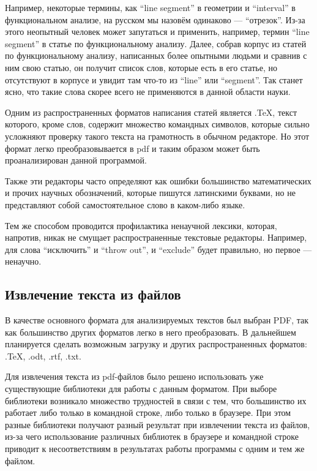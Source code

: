 \documentclass[a4paper,openbib]{report}
\begin{document}
Например, некоторые термины, как ``line segment'' в геометрии и ``interval'' в функциональном анализе, на русском мы назовём одинаково --- ``отрезок''. 
Из-за этого неопытный человек может запутаться и применить, например, термин ``line segment'' в статье по функциональному анализу. Далее, собрав корпус 
из статей по функциональному анализу, написанных более опытными людьми и сравнив с ним свою статью, он получит список слов, которые есть в его статье, но 
отсутствуют в корпусе и увидит там что-то из ``line'' или ``segment''. Так станет ясно, что такие слова скорее всего не применяются 
в данной области науки.

Одним из распространенных форматов написания статей является .TeX, текст которого, кроме слов, содержит множество командных символов, которые сильно усложняют 
проверку такого текста на грамотность в обычном редакторе. Но этот формат легко преобразовывается в pdf и таким образом может быть проанализирован данной программой.

Также эти редакторы часто определяют как ошибки большинство математических и прочих научных обозначений, которые пишутся латинскими буквами, но не представляют 
собой самостоятельное слово в каком-либо языке. 

Тем же способом проводится профилактика ненаучной лексики, которая, напротив, никак не смущает распространенные текстовые редакторы. Например, для слова 
``исключить'' и ``throw out'', и ``exclude'' будет правильно, но первое --- ненаучно.

\subsection*{Извлечение текста из файлов}

В качестве основного формата для анализируемых текстов был выбран PDF, так как большинство других форматов легко в него преобразовать. В дальнейшем планируется 
сделать возможным загрузку и других распространенных форматов: .TeX, .odt, .rtf, .txt.

Для извлечения текста из pdf-файлов было решено использовать уже существующие библиотеки для работы с данным форматом. При выборе библиотеки возникало множество 
трудностей в связи с тем, что большинство их работает либо только в командной строке, либо только в браузере. При этом разные библиотеки получают разный результат 
при извлечении текста из файлов, из-за чего использование различных библиотек в браузере и командной строке приводит к несоответствиям в результатах работы программы 
с одним и тем же файлом.
\end{document}
